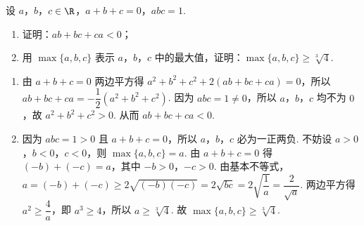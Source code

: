 \begin{problem}
设 \(a\)，\(b\)，\(c\in \R\)，\(a+b+c=0\)，\(abc=1\).

\begin{enumerate}
    \item 证明：\(ab+bc+ca<0\)；
    \item 用 \(\max\{a,b,c\}\) 表示 \(a\)，\(b\)，\(c\) 中的最大值，证明：\(\max\{a,b,c\}\ge \sqrt[3]{4}\).
\end{enumerate}
\end{problem}

\begin{solution}
\begin{enumerate}
    \item 由 \(a+b+c=0\) 两边平方得 \(a^2+b^2+c^2+2(ab+bc+ca)=0\)，所以 \(ab+bc+ca=-\dfrac12(a^2+b^2+c^2)\). 因为 \(abc=1\ne0\)，所以 \(a\)，\(b\)，\(c\) 均不为 \(0\)，故 \(a^2+b^2+c^2>0\). 从而 \(ab+bc+ca<0\).
    \item 因为 \(abc=1>0\) 且 \(a+b+c=0\)，所以 \(a\)，\(b\)，\(c\) 必为一正两负. 不妨设 \(a>0\)，\(b<0\)，\(c<0\)，则 \(\max\{a,b,c\}=a\). 由 \(a+b+c=0\) 得 \((-b)+(-c)=a\)，其中 \(-b>0\)，\(-c>0\). 由基本不等式，\(a=(-b)+(-c)\ge2\sqrt{(-b)(-c)}=2\sqrt{bc}=2\sqrt{\dfrac1a}=\dfrac{2}{\sqrt a}\). 两边平方得 \(a^2\ge\dfrac4a\)，即 \(a^3\ge4\)，所以 \(a\ge\sqrt[3]4\). 故 \(\max\{a,b,c\}\ge\sqrt[3]4\).
\end{enumerate}
\end{solution}

